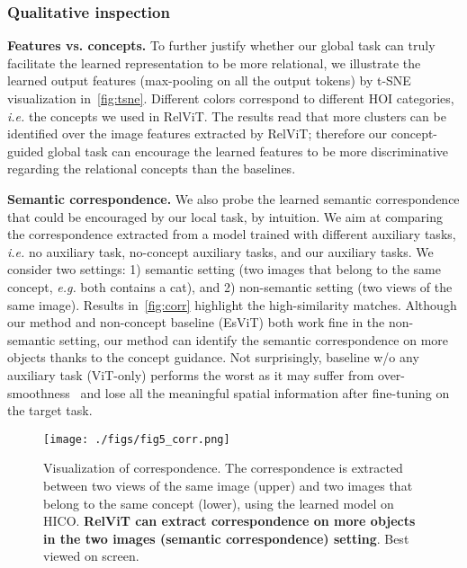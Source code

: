 \documentclass{article} \usepackage{iclr2022_conference,times}
\renewcommand{\paragraph}[1]{\noindent\textbf{#1.}}
\begin{document}
\vspace{-2pt}
\subsubsection{Qualitative inspection}
\vspace{-3pt}

\paragraph{Features vs. concepts} To further justify whether our global task can truly facilitate the learned representation to be more relational, we illustrate the learned output features (max-pooling on all the output tokens) by t-SNE visualization in~\autoref{fig:tsne}. Different colors correspond to different HOI categories, \emph{i.e.} the concepts we used in RelViT. The results read that more clusters can be identified over the image features extracted by RelViT; therefore our concept-guided global task can encourage the learned features to be more discriminative regarding the relational concepts than the baselines.  

\label{sec:exp_rcl_ins}

\paragraph{Semantic correspondence} We also probe the learned semantic correspondence that could be encouraged by our local task, by intuition. We aim at comparing the correspondence extracted from a model trained with different auxiliary tasks, \emph{i.e.} no auxiliary task, no-concept auxiliary tasks, and our auxiliary tasks. We consider two settings: 1) semantic setting (two images that belong to the same concept, \emph{e.g.} both contains a cat), and 2) non-semantic setting (two views of the same image). Results in~\autoref{fig:corr} highlight the high-similarity matches. 
Although our method and non-concept baseline (EsViT) both work fine in the non-semantic setting, our method can identify the semantic correspondence on more objects thanks to the concept guidance.
Not surprisingly, baseline w/o any auxiliary task (ViT-only) performs the worst as it may suffer from over-smoothness~\citep{gong2021improve} and lose all the meaningful spatial information after fine-tuning on the target task.


\vspace{-0.1in}
\begin{figure}[t!]
    \centering
    \texttt{[image: ./figs/fig5\_corr.png]}
        \vskip-0.2in
    \caption{Visualization of correspondence. The correspondence is extracted between two views of the same image (upper) and two images that belong to the same concept (lower), using the learned model on HICO. \textbf{RelViT can extract correspondence on more objects in the two images (semantic correspondence) setting}. Best viewed on screen.}
    \label{fig:corr}
    \vskip -0.2in
\end{figure}
\end{document}
